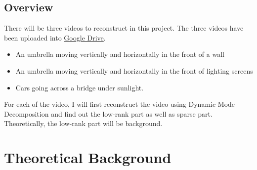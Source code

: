 \documentclass[twoside,twocolumn]{article}
\begin{document}
    \subsection{Overview}
    There will be three videos to reconstruct in this project. The three videos have been uploaded into 
    \href{https://drive.google.com/open?id=1NQpCD_8bFmLH0jHF4fFBumEW4RrjgOjm}{Google Drive}. 
    \begin{itemize}
        \item An umbrella moving vertically and horizontally in the front of a wall
        \item An umbrella moving vertically and horizontally in the front of lighting screens
        \item Cars going across a bridge under sunlight.
    \end{itemize}
    For each of the video, I will first reconstruct the video using Dynamic Mode Decomposition and find out the low-rank part 
    as well as sparse part. Theoretically, the low-rank part will be background.


    \section{Theoretical Background}
\end{document}
